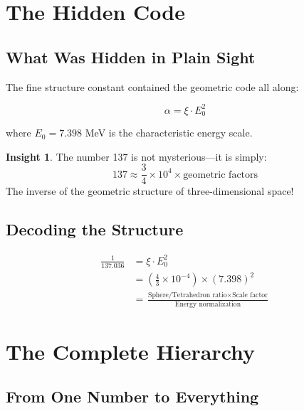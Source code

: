 \documentclass[12pt,a4paper]{article}
\theoremstyle{definition}
\newtheorem{insight}{Insight}[section]
\begin{document}
	\section{The Hidden Code}
	
	\subsection{What Was Hidden in Plain Sight}
	
	The fine structure constant contained the geometric code all along:
	
	\begin{equation}
		\alpha = \xi \cdot E_0^2
	\end{equation}
	
	where $E_0 = 7.398$ MeV is the characteristic energy scale.
	
	\begin{insight}
		The number 137 is not mysterious---it is simply:
		\begin{equation}
			137 \approx \frac{3}{4} \times 10^4 \times \text{geometric factors}
		\end{equation}
		The inverse of the geometric structure of three-dimensional space!
	\end{insight}
	
	\subsection{Decoding the Structure}
	
	\begin{fundamental}
		\begin{align}
			\frac{1}{137.036} &= \xi \cdot E_0^2\\
			&= \left(\frac{4}{3} \times 10^{-4}\right) \times (7.398)^2\\
			&= \frac{\text{Sphere/Tetrahedron ratio} \times \text{Scale factor}}{\text{Energy normalization}}
		\end{align}
	\end{fundamental}
	
	\section{The Complete Hierarchy}
	
	\subsection{From One Number to Everything}
	
\end{document}
